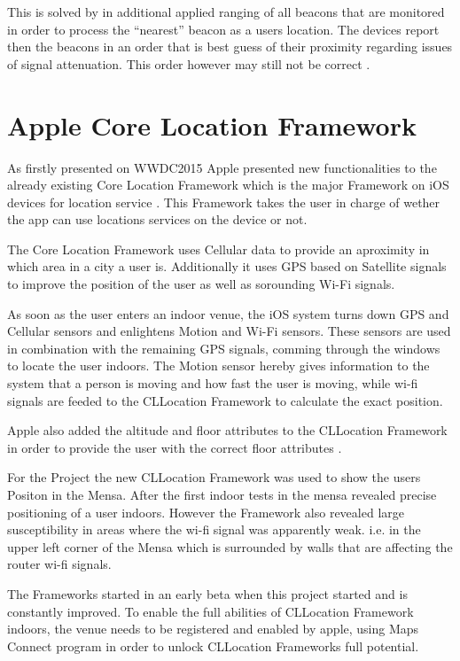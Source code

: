 This is solved by in additional applied ranging of all beacons that are monitored in order to process the \enquote{nearest} beacon as a users location. The devices report then the beacons in an order that is best guess of their proximity regarding issues of signal attenuation. This order however may still not be correct \cite{appleIBeacon}.


\vspace{0.5cm}

\section{Apple Core Location Framework}

As firstly presented on WWDC2015 \cite{wwdc15}  Apple presented new functionalities to the already existing Core Location Framework which is the major Framework on iOS devices for location service \cite{CLlocation}. This Framework takes the user in charge of wether the app can use locations services on the device or not.

The Core Location Framework uses Cellular data to provide an aproximity in which area in a city a user is. Additionally it uses GPS based on Satellite signals to improve the position of the user as well as sorounding Wi-Fi signals.

As soon as the user enters an indoor venue, the iOS system turns down GPS and Cellular sensors and enlightens Motion and Wi-Fi sensors.
These sensors are used in combination with the remaining GPS signals, comming through the windows to locate the user indoors. The Motion sensor hereby gives information to the system that a person is moving and how fast the user is moving, while wi-fi signals are feeded to the CLLocation Framework to calculate the exact position.

Apple also added the altitude and floor attributes to the CLLocation Framework in order to provide the user with the correct floor attributes \cite{CLlocation}.

For the Project the new CLLocation Framework was used to show the users Positon in the Mensa. After the first indoor tests in the mensa revealed precise positioning of a user indoors. However the Framework also revealed large susceptibility in areas where the wi-fi signal was apparently weak. i.e. in the upper left corner of the Mensa which is surrounded by walls that are affecting the router wi-fi signals.

The Frameworks started in an early beta when this project started and is constantly improved. To enable the full abilities of CLLocation Framework indoors, the venue needs to be registered and enabled by apple, using Maps Connect program \cite{mapsConnect} in order to unlock CLLocation Frameworks full potential.


